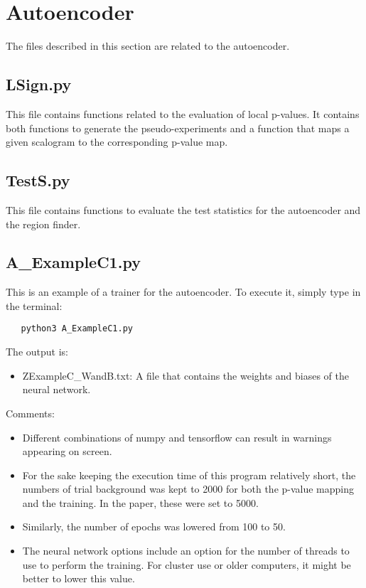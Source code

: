 \documentclass{article}
\begin{document}
\pagebreak

\section{Autoencoder}
The files described in this section are related to the autoencoder. 

\subsection{LSign.py}
This file contains functions related to the evaluation of local p-values. It contains both functions to generate the pseudo-experiments and a function that maps a given scalogram to the corresponding p-value map.

\subsection{TestS.py}
This file contains functions to evaluate the test statistics for the autoencoder and the region finder.

\subsection{A\_ExampleC1.py}
This is an example of a trainer for the autoencoder. To execute it, simply type in the terminal:
\begin{verbatim}
   python3 A_ExampleC1.py
\end{verbatim}
The output is:
\begin{itemize}
  \item ZExampleC\_WandB.txt: A file that contains the weights and biases of the neural network.
\end{itemize}
Comments:
\begin{itemize}
  \item Different combinations of numpy and tensorflow can result in warnings appearing on screen.
  \item For the sake keeping the execution time of this program relatively short, the numbers of trial background was kept to 2000 for both the p-value mapping and the training. In the paper, these were set to 5000.
  \item Similarly, the number of epochs was lowered from 100 to 50.
  \item The neural network options include an option for the number of threads to use to perform the training. For cluster use or older computers, it might be better to lower this value.
\end{itemize}
\end{document}
